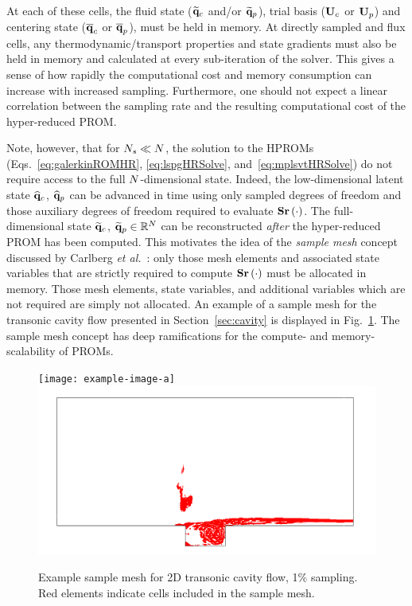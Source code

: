 At each of these cells, the fluid state ($\mathbf{\widetilde{q}}_{c}$ and/or $\mathbf{\widetilde{q}}_{p}$), trial basis ($\consTrial$ or $\primTrial$) and centering state ($\mathbf{\overline{q}}_{c}$ or $\mathbf{\overline{q}}_{p}$), must be held in memory. At directly sampled and flux cells, any thermodynamic/transport properties and state gradients must also be held in memory and calculated at every sub-iteration of the solver. This gives a sense of how rapidly the computational cost and memory consumption can increase with increased sampling. Furthermore, one should not expect a linear correlation between the sampling rate and the resulting computational cost of the hyper-reduced PROM.

Note, however, that for $N_s \ll N$, the solution to the HPROMs (Eqs.~\ref{eq:galerkinROMHR}, \ref{eq:lspgHRSolve}, and~\ref{eq:mplsvtHRSolve}) do not require access to the full $N$-dimensional state. Indeed, the low-dimensional latent state $\mathbf{\widehat{q}}_{c}$, $\mathbf{\widehat{q}}_{p}$ can be advanced in time using only sampled degrees of freedom and those auxiliary degrees of freedom required to evaluate $\mathbf{S} \mathbf{r}\left(\cdot\right)$. The full-dimensional state $\mathbf{\widetilde{q}}_{c}$, $\mathbf{\widetilde{q}}_{p} \in \mathbb{R}^{N}$ can be reconstructed \textit{after} the hyper-reduced PROM has been computed. This motivates the idea of the \textit{sample mesh} concept discussed by Carlberg \textit{et al.}~\cite{Carlberg2013}: only those mesh elements and associated state variables that are strictly required to compute $\mathbf{S} \mathbf{r}\left(\cdot\right)$ must be allocated in memory. Those mesh elements, state variables, and additional variables which are not required are simply not allocated. An example of a sample mesh for the transonic cavity flow presented in Section~\ref{sec:cavity} is displayed in Fig.~\ref{fig:sampMeshExample}. The sample mesh concept has deep ramifications for the compute- and memory-scalability of PROMs.

\begin{figure}
	\centering
	\ifdefined\DRAFT
		\texttt{[image: example-image-a]}
	\else
		\includegraphics[width=0.75\linewidth]{Chapters/HPROMs/Images/cavity_sample_mesh.png}
	\fi
	\caption{\label{fig:sampMeshExample}Example sample mesh for 2D transonic cavity flow, 1\% sampling. Red elements indicate cells included in the sample mesh.}
\end{figure}

